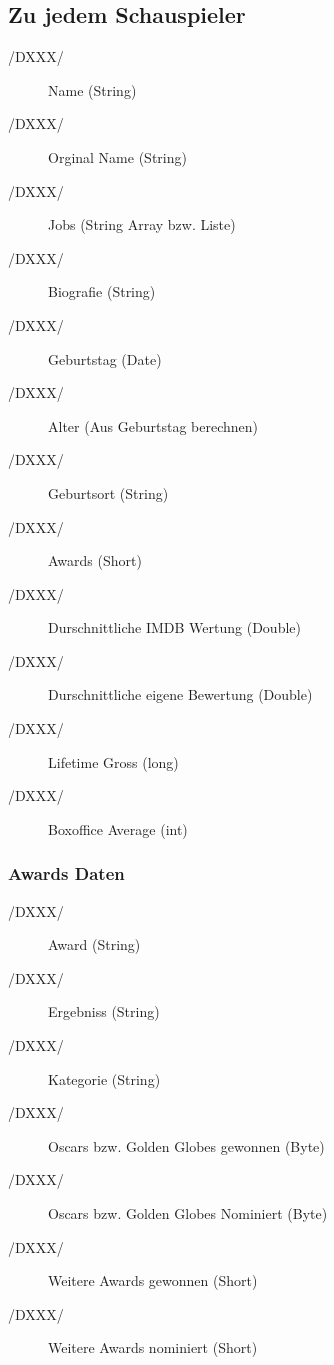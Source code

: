 \subsection{Zu jedem Schauspieler}
	\begin{description}
		\item[/DXXX/] Name (String)
		\item[/DXXX/] Orginal Name (String)
		\item[/DXXX/] Jobs (String Array bzw. Liste)
		\item[/DXXX/] Biografie (String)
		\item[/DXXX/] Geburtstag (Date)
		\item[/DXXX/] Alter (Aus Geburtstag berechnen)
		\item[/DXXX/] Geburtsort (String)
		\item[/DXXX/] Awards (Short)
		\item[/DXXX/] Durschnittliche IMDB Wertung (Double)
		\item[/DXXX/] Durschnittliche eigene Bewertung (Double)
		\item[/DXXX/] Lifetime Gross (long)
		\item[/DXXX/] Boxoffice Average (int)
	\end{description}
	\subsubsection{Awards Daten}
		\begin{description}
			\item[/DXXX/] Award (String)
			\item[/DXXX/] Ergebniss (String)
			\item[/DXXX/] Kategorie (String)
			\item[/DXXX/] Oscars bzw. Golden Globes gewonnen (Byte)
			\item[/DXXX/] Oscars bzw. Golden Globes Nominiert (Byte)
			\item[/DXXX/] Weitere Awards gewonnen (Short)
			\item[/DXXX/] Weitere Awards nominiert (Short)
		\end{description}
